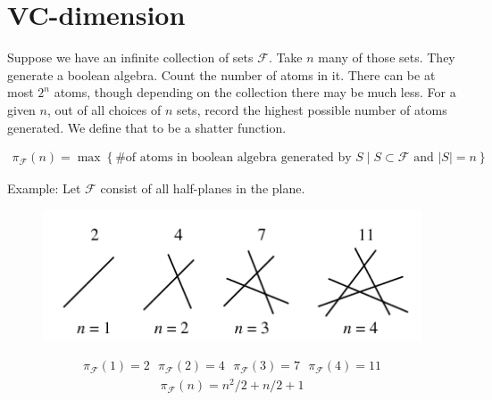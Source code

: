 \documentclass{amsart}
\newcommand{\F}{\mathcal F}
\newcommand{\curly}[1]{\left\{ #1 \right\}}
\begin{document}
\section{VC-dimension}

Suppose we have an infinite collection of sets $\F$.
Take $n$ many of those sets.
They generate a boolean algebra.
Count the number of atoms in it.
There can be at most $2^n$ atoms, though depending on the collection there may be much less.
For a given $n$, out of all choices of $n$ sets, record the highest possible number of atoms generated.
We define that to be a shatter function.

\begin{Definition}
	\begin{align*}
		\pi_\F(n) = \max \curly{ \text {\# of atoms in boolean algebra generated by $S$} \mid S \subset \F \text{ and } |S| = n}
	\end{align*}
\end{Definition}

\begin{frame}
	Example: Let $\F$ consist of all half-planes in the plane.
	\begin{figure}[p]
    \centering
    \includegraphics[scale=0.75]{lines.png}
	\end{figure}
	\begin{align*}
		\pi_\F(1) = 2 \ \ \  \pi_\F(2) = 4 \ \ \  \pi_\F(3) = 7  \ \ \ \pi_\F(4) = 11
	\end{align*}
	\begin{align*}
		\pi_\F(n) = n^2/2 + n/2 + 1
	\end{align*}
\end{frame}
\end{document}
